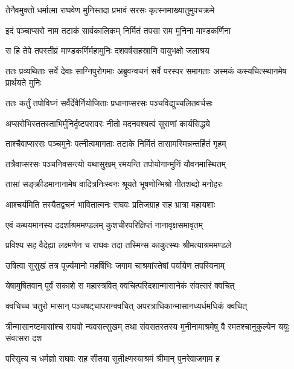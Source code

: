 \twolineshloka
{तेनैवमुक्तो धर्मात्मा राघवेण मुनिस्तदा}
{प्रभावं सरसः कृत्स्नमाख्यातुमुपचक्रमे} %

\twolineshloka
{इदं पञ्चाप्सरो नाम तटाकं सार्वकालिकम्}
{निर्मितं तपसा राम मुनिना माण्डकर्णिना} %

\twolineshloka
{स हि तेपे तपस्तीव्रं माण्डकर्णिर्महामुनिः}
{दशवर्षसहस्राणि वायुभक्षो जलाश्रय} %

\threelineshloka
{ततः प्रव्यथिताः सर्वे देवाः साग्निपुरोगमाः}
{अब्रुवन्वचनं सर्वे परस्पर समागताः}
{अस्मकं कस्यचित्स्थानमेष प्रार्थयते मुनिः} %

\twolineshloka
{ततः कर्तुं तपोविघ्नं सर्वैर्देवैर्नियोजिताः}
{प्रधानाप्सरसः पञ्चविद्युच्चलितवर्चसः} %

\twolineshloka
{अप्सरोभिस्ततस्ताभिर्मुनिर्दृष्टपरावरः}
{नीतो मदनवश्यत्वं सुराणां कार्यसिद्धये} %

\twolineshloka
{ताश्चैवाप्सरसः पञ्चमुनेः पत्नीत्वमागताः}
{तटाके निर्मितं तासामस्मिन्नन्तर्हितं गृहम्} %

\twolineshloka
{तत्रैवाप्सरसः पञ्चनिवसन्त्यो यथासुखम्}
{रमयन्ति तपोयोगान्मुनिं यौवनमास्थितम्} %

\twolineshloka
{तासां सङ्क्रीडमानानामेष वादित्रनिःस्वनः}
{श्रूयते भूषणोन्मिश्रो गीतशब्दो मनोहरः} %

\twolineshloka
{आश्चर्यमिति तस्यैतद्वचनं भावितात्मनः}
{राघवः प्रतिजग्राह सह भ्रात्रा महायशाः} %

\twolineshloka
{एवं कथयमानस्य ददर्शाश्रममण्डलम्}
{कुशचीरपरिक्षिप्तं नानावृक्षसमावृतम्} %

\twolineshloka
{प्रविश्य सह वैदेह्या लक्ष्मणेन च राघवः}
{तदा तस्मिन्स काकुत्स्थः श्रीमत्याश्रममण्डले} %

\twolineshloka
{उषित्वा सुसुखं तत्र पूर्ज्यमानो महर्षिभिः}
{जगाम चाश्रमांस्तेषां पर्यायेण तपस्विनाम्} %

\twolineshloka
{येषामुषितवान् पूर्वं सकाशे स महास्त्रवित्}
{क्वचित्परिदशान्मासानेकं संवत्सरं क्वचित्} %

\twolineshloka
{क्वचिच्च चतुरो मासान् पञ्चषट्चापरान्क्वचित्}
{अपरत्राधिकान्मासानध्यर्धमधिकं क्वचित्} %

\threelineshloka
{त्रीन्मासानष्टमासांश्च राघवो न्यवसत्सुखम्}
{तथा संवसतस्तस्य मुनीनामाश्रमेषु वै}
{रमतश्चानुकुल्येन ययुः संवत्सरा दश} %

\twolineshloka
{परिसृत्य च धर्मज्ञो राघवः सह सीतया}
{सुतीक्ष्णस्याश्रमं श्रीमान् पुनरेवाजगाम ह} %

